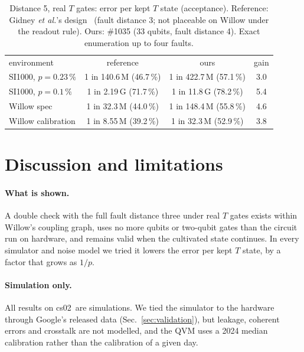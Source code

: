 \documentclass[aps,pra,reprint,superscriptaddress,longbibliography]{revtex4-2}
\newcommand{\csz}{\textsf{cs02}}
\begin{document}
\begin{table}[t]
\caption{Distance 5, real $T$ gates: error per kept $T$ state (acceptance). Reference: Gidney \emph{et al.}'s design~\cite{Gidney2024cultivation} (fault distance 3; not placeable on Willow under the readout rule). Ours: \#1035 (33 qubits, fault distance 4). Exact enumeration up to four faults.}
\label{tab:d5}
\begin{ruledtabular}
\begin{tabular}{lccc}
environment & reference & ours & gain\\
\colrule
SI1000, $p=0.23\,\%$ & 1 in 140.6\,M (46.7\,\%) & 1 in 422.7\,M (57.1\,\%) & 3.0\\
SI1000, $p=0.1\,\%$ & 1 in 2.19\,G (71.7\,\%) & 1 in 11.8\,G (78.2\,\%) & 5.4\\
Willow spec & 1 in 32.3\,M (44.0\,\%) & 1 in 148.4\,M (55.8\,\%) & 4.6\\
Willow calibration & 1 in 8.55\,M (39.2\,\%) & 1 in 32.3\,M (52.9\,\%) & 3.8\\
\end{tabular}
\end{ruledtabular}
\end{table}

\section{Discussion and limitations}
\label{sec:limitations}

\paragraph{What is shown.}
A double check with the full fault distance three under real $T$ gates exists within Willow's coupling graph, uses no more qubits or two-qubit gates than the circuit run on hardware, and remains valid when the cultivated state continues.
In every simulator and noise model we tried it lowers the error per kept $T$ state, by a factor that grows as $1/p$.

\paragraph{Simulation only.}
All results on \csz\ are simulations. We tied the simulator to the hardware through Google's released data (Sec.~\ref{sec:validation}), but leakage, coherent errors and crosstalk are not modelled, and the QVM uses a 2024 median calibration rather than the calibration of a given day.
\end{document}

